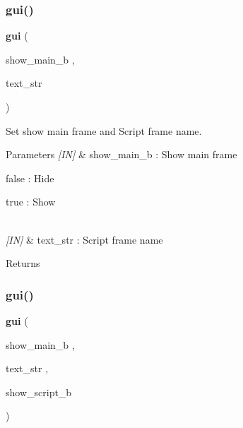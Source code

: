 \subsubsection{gui()\hspace{0.1cm}{\footnotesize\ttfamily [2/3]}}
{\footnotesize\ttfamily \textbf{ gui} (\begin{DoxyParamCaption}\item[{show\+\_\+main\+\_\+b}]{,  }\item[{text\+\_\+str}]{ }\end{DoxyParamCaption})}



Set show main frame and Script frame name. 


\begin{DoxyCode}{0}
\end{DoxyCode}



\begin{DoxyParams}{Parameters}
{\em \mbox{[}\+I\+N\mbox{]}} & show\+\_\+main\+\_\+b \+: Show main frame \begin{DoxyItemize}
\item false \+: Hide \item true \+: Show \end{DoxyItemize}
\\
\hline
{\em \mbox{[}\+I\+N\mbox{]}} & text\+\_\+str \+: Script frame name \\
\hline
\end{DoxyParams}
\begin{DoxyReturn}{Returns}

\end{DoxyReturn}
\mbox{\label{group___public__function_gabbb34ac83c7ffbe9c3eee29c9ca186d6}} 
\subsubsection{gui()\hspace{0.1cm}{\footnotesize\ttfamily [3/3]}}
{\footnotesize\ttfamily \textbf{ gui} (\begin{DoxyParamCaption}\item[{show\+\_\+main\+\_\+b}]{,  }\item[{text\+\_\+str}]{,  }\item[{show\+\_\+script\+\_\+b}]{ }\end{DoxyParamCaption})}



